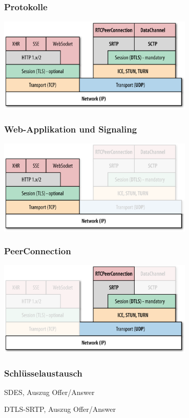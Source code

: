 \documentclass[12pt]{beamer}
\begin{document}
\subsection{} 

\begin{frame}
  \frametitle{Protokolle}
  \centerline{\includegraphics[width=0.7\textwidth]{img/stack_oreilly.png}}
\end{frame}

\begin{frame}
  \frametitle{Web-Applikation und Signaling}
  \centerline{\includegraphics[width=0.7\textwidth]{img/stack_oreilly_signaling.png}}
\end{frame}

\begin{frame}
  \frametitle{PeerConnection}
  \centerline{\includegraphics[width=0.7\textwidth]{img/stack_oreilly_pc.png}}
\end{frame}

\begin{frame}
  \frametitle{Schlüsselaustausch}
  \pause
  
  \hfill \tiny SDES, Auszug Offer/Answer
  \vspace{15pt} \\
  \pause
  
  \hfill \tiny DTLS-SRTP, Auszug Offer/Answer
\end{frame}
\end{document}
